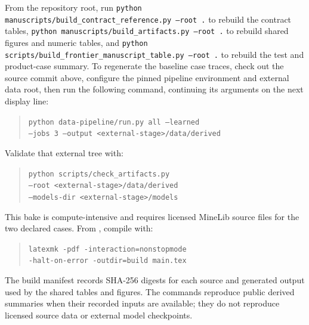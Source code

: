 \documentclass[11pt]{article}
\begin{document}
From the repository root, run \texttt{python manuscripts/build\_contract\_reference.py --root .} to rebuild the contract tables, \texttt{python manuscripts/build\_artifacts.py --root .} to rebuild shared figures and numeric tables, and \texttt{python scripts/build\_frontier\_manuscript\_table.py --root .} to rebuild the test and product-case summary. To regenerate the baseline case traces, check out the source commit above, configure the pinned pipeline environment and external data root, then run the following command, continuing its arguments on the next display line:
\begin{quote}\footnotesize
\texttt{python data-pipeline/run.py all --learned}\\
\texttt{--jobs 3 --output <external-stage>/data/derived}
\end{quote}
Validate that external tree with:
\begin{quote}\footnotesize
\texttt{python scripts/check\_artifacts.py}\\
\texttt{--root <external-stage>/data/derived}\\
\texttt{--models-dir <external-stage>/models}
\end{quote}
This bake is compute-intensive and requires licensed MineLib source files for the two declared cases. From , compile with:
\begin{quote}\footnotesize
\texttt{latexmk -pdf -interaction=nonstopmode}\\
\texttt{-halt-on-error -outdir=build main.tex}
\end{quote}
The build manifest records SHA-256 digests for each source and generated output used by the shared tables and figures. The commands reproduce public derived summaries when their recorded inputs are available; they do not reproduce licensed source data or external model checkpoints.
\end{document}
